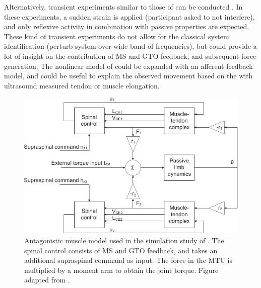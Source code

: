 Alternatively, transient experiments similar to those of \citeauthor{de_gooijer-van_de_groep_estimation_2016} can be conducted \cite{de_gooijer-van_de_groep_estimation_2016}. In these experiments, a sudden strain is applied (participant asked to not interfere), and only reflexive activity in combination with passive properties are expected. These kind of transient experiments do not allow for the classical system identification (perturb system over wide band of frequencies), but could provide a lot of insight on the contribution of MS and GTO feedback, and subsequent force generation. The nonlinear model of \cite{de_gooijer-van_de_groep_estimation_2016} could be expanded with an afferent feedback model, and could be useful to explain the observed movement based on the with ultrasound measured tendon or muscle elongation. 


\begin{figure}[t]
	\centering
	\includegraphics[width=.8\linewidth]{Figures/elastography/mugge_antagonistic.pdf}
	\caption{Antagonistic muscle model used in the simulation study of \citet{mugge_modeling_2012}. The spinal control consists of MS and GTO feedback, and takes an additional supraspinal command as input. The force in the MTU is multiplied by a moment arm to obtain the joint torque. Figure adapted from \citet{mugge_modeling_2012}.}
	\label{fig:mugge_antagonistic}
\end{figure}


